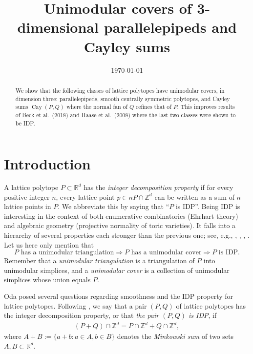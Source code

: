 \documentclass{amsart}
\date{\today}
\title{Unimodular covers of 3-dimensional parallelepipeds and Cayley sums}
\author{}
\theoremstyle{plain}
\theoremstyle{definition}
\newcommand{\Z}{ \ensuremath{\mathbb{Z}}}
\newcommand{\R}{ \ensuremath{\mathbb{R}}}
\newcommand{\cayley}{\operatorname{Cay}}
\newcommand{\paco}[1]{\todo[size=\tiny,color=green!30]{#1 \\ \hfill --- P.}}
\begin{document}
\begin{abstract}
We show that the following classes of lattice polytopes have unimodular covers, in dimension three:  parallelepipeds,  smooth centrally symmetric polytopes, and  Cayley sums $\cayley(P,Q)$ where the normal fan of $Q$ refines that of $P$. This improves results of Beck et al.~(2018) and Haase et al.~(2008) where the last two classes were shown to be IDP.
\end{abstract}

\maketitle


\section{Introduction}

A lattice polytope $P\subset \R^d$ has the \emph{integer decomposition property} if for every positive integer $n$, every lattice point $p \in nP\cap \Z^d$ can be written as a sum of $n$ lattice points in $P$. We abbreviate this by saying that ``$P$ is IDP''. Being IDP is interesting in the context of  both enumerative combinatorics (Ehrhart theory) and algebraic geometry (projective normality of toric
varieties). It falls into a hierarchy of several properties each stronger than the previous one; see, e.g., \cite[Section 2.D]{BGbook}, \cite[Sect. 1.2.5]{HPPS-survey}, \cite[p. 2097]{mfo2004}, \cite[p. 2313]{mfo2007}.
Let us here only mention that
\[
P \text{ has a unimodular triangulation}\Rightarrow
P \text{ has a unimodular cover}\Rightarrow
P \text{ is IDP.}
\]
Remember that a \emph{unimodular triangulation} is a triangulation of $P$ into unimodular simplices, and a \emph{unimodular cover} is a collection of unimodular simplices whose union equals $P$. 

Oda \cite{Oda1997} posed several questions regarding smoothness and the IDP property for lattice polytopes.
%
Following \cite{HaaseHof, Tsuchiya}, we say that a pair $(P, Q)$ of lattice polytopes has the integer decomposition property, or that \emph{the pair $(P,Q)$ is IDP}, if 
\begin{align*}
\label{eq:mixedIDP}
(P+Q) \cap \Z^d = P \cap \Z^d + Q \cap \Z^d,
\end{align*}
where $A+B :=\{a+b: a\in A, b\in B\}$ denotes the \emph{Minkowski sum} of two sets $A,B\subset \R^d$.
\paco{added def of Minkowski sum}
\end{document}
